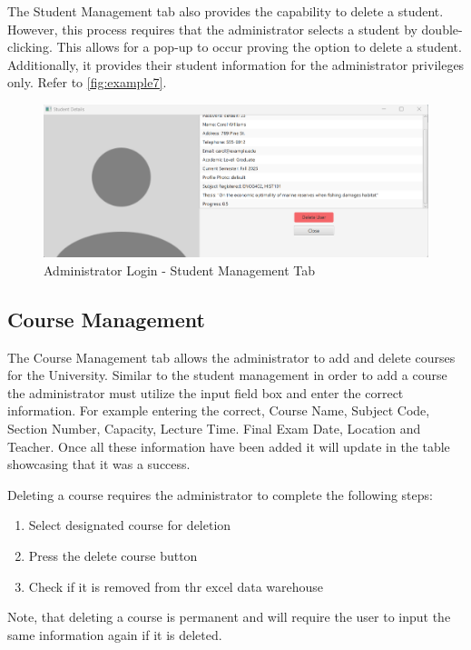 The Student Management tab also provides the capability to delete a student. However, this process requires that the administrator selects a student by double-clicking. This allows for a pop-up to occur proving the option to delete a student. Additionally, it provides their student information for the administrator privileges only. Refer to \autoref{fig:example7}.

\begin{figure}[ht!]
    \centering
        \centering\includegraphics[width=1\linewidth]{figures/Student_Management_Delete.png}
        \caption{Administrator Login - Student Management Tab}
        \label{fig:example7}  
\end{figure}

\newpage
\subsection{Course Management}

The Course Management tab allows the administrator to add and delete courses for the University. Similar to the student management in order to add a course the administrator must utilize the input field box and enter the correct information. For example entering the correct, Course Name, Subject Code, Section Number, Capacity, Lecture Time. Final Exam Date, Location and Teacher. Once all these information have been added it will update in the table showcasing that it was a success.

Deleting a course requires the administrator to complete the following steps:
\begin{enumerate}
    \item Select designated course for deletion
    \item Press the delete course button
    \item Check if it is removed from thr excel data warehouse
\end{enumerate}

Note, that deleting a course is permanent and will require the user to input the same information again if it is deleted.

